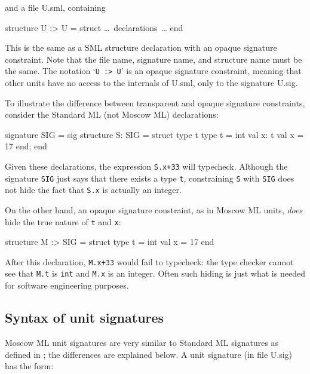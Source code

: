 \documentclass[fleqn]{article}
\begin{document}
\noindent and a file U.sml, containing

\begin{program}
structure U :> U = struct {\rm \ldots\ declarations\ \ldots} end
\end{program}

\noindent This is the same as a SML structure declaration with an
opaque signature constraint.  Note that the file name, signature name,
and structure name must be the same.  The notation `{\tt U :> U}' is
an opaque signature constraint, meaning that other units have no
access to the internals of U.sml, only to the signature U.sig.

To illustrate the difference between transparent and opaque signature
constraints, consider the Standard ML (not Moscow ML) declarations:

\begin{program}
signature SIG = sig                     structure S: SIG = struct
    type t                                  type t = int   
    val x: t                                val x = 17     
end;                                    end                             
\end{program}

\noindent Given these declarations, the expression {\tt S.x+33} will
typecheck.  Although the signature {\tt SIG} just says that there
exists a type {\tt t}, constraining {\tt S} with {\tt SIG} does not
hide the fact that {\tt S.x} is actually an integer.

On the other hand, an opaque signature constraint, as in Moscow ML
units, {\em does\/} hide the true nature of {\tt t} and {\tt x}:

\begin{program}
structure M :> SIG = struct
    type t = int
    val x = 17
end                             
\end{program}

\noindent After this declaration, {\tt M.x+33} would fail to
typecheck: the type checker cannot see that {\tt M.t} is {\tt int} and
{\tt M.x} is an integer.  Often such hiding is just what is needed for
software engineering purposes.


\subsection{Syntax of unit signatures}
\label{sec-syntax-signatures}

Moscow ML unit signatures are very similar to Standard ML signatures
as defined in \cite{Milner:1997:TheDefinition}; the differences are
explained below.  A unit signature (in file U.sig) has the form:
\end{document}
